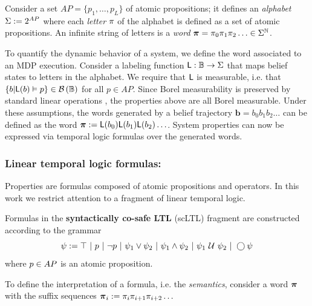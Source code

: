 \documentclass{ifacconf}
\begin{document}
Consider a set $AP = \{ p_1, \ldots, p_L \}$ of atomic propositions; it defines an \emph{alphabet} $\Sigma := 2^{AP}$ where each \emph{letter} $\pi$ of the alphabet is defined as a set of atomic propositions. An infinite string of letters is a \emph{word} ${\boldsymbol{\pi}}=\pi_0\pi_1\pi_2\ldots\in\Sigma^{\mathbb{N}}$.

To quantify the dynamic behavior of a system, we define the word associated to an MDP execution. Consider a labeling function $\mathsf{L}:\mathbb{B}\rightarrow \Sigma$ that maps belief states to letters in the alphabet. We require that $\mathsf{L}$ is measurable, i.e. that $\{b|\mathsf{L}(b)\vDash p \}\in \mathcal{B}\left(\mathbb{B}\right)$ for all $p \in AP$. Since Borel measurability is preserved by standard linear operations \citep{azoff1974borel}%
, the properties above are all Borel measurable. Under these assumptions, the words generated by a belief trajectory $\mathbf{b} = b_0 b_1 b_2 \ldots$ can be defined as the word ${\boldsymbol{\pi}}:=\mathsf{L}(b_0)\mathsf{L}(b_1) \mathsf{L}(b_2) \ldots$. System properties can now be expressed via temporal logic formulas over the generated words.

\subsubsection{Linear temporal logic formulas:}

Properties are formulas composed of atomic propositions and operators. In this work we restrict attention to a fragment of linear temporal logic.
\begin{definition}
  \label{def:gdtl-syntax}
  Formulas in the \textbf{syntactically co-safe LTL} (scLTL) fragment are constructed according to the grammar
  \begin{equation*}
    \label{eq:scLTL}
    \psi :=  \True \ |\ p \ |\ \notltl p \ |\ \psi_1 \vee\psi_2  \ |\ \psi_1 \andltl \psi_2 \ |\ \psi_1 \Until \psi_2 \ |\ \Next \psi
  \end{equation*}
  where $p\in {AP}$ is an atomic proposition.
\end{definition}

To define the interpretation of a formula, i.e. the \emph{semantics}, consider a word ${\boldsymbol{\pi}}$ with the suffix sequences ${\boldsymbol{\pi}}_i:= \pi_i \pi_{i+1} \pi_{i+2} \ldots$
\end{document}

